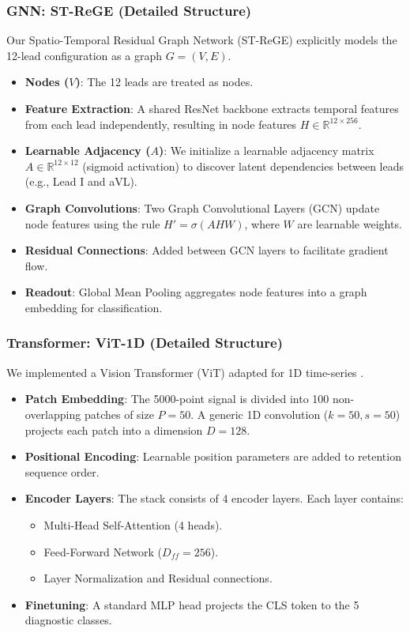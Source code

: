 \documentclass[conference]{IEEEtran}
\begin{document}
\subsubsection{GNN: ST-ReGE (Detailed Structure)}
Our Spatio-Temporal Residual Graph Network (ST-ReGE) explicitly models the 12-lead configuration as a graph $G=(V, E)$.
\begin{itemize}
    \item \textbf{Nodes ($V$)}: The 12 leads are treated as nodes.
    \item \textbf{Feature Extraction}: A shared ResNet backbone extracts temporal features from each lead independently, resulting in node features $H \in \mathbb{R}^{12 \times 256}$.
    \item \textbf{Learnable Adjacency ($A$)}: We initialize a learnable adjacency matrix $A \in \mathbb{R}^{12 \times 12}$ (sigmoid activation) to discover latent dependencies between leads (e.g., Lead I and aVL).
    \item \textbf{Graph Convolutions}: Two Graph Convolutional Layers (GCN) update node features using the rule $H' = \sigma(A H W)$, where $W$ are learnable weights.
    \item \textbf{Residual Connections}: Added between GCN layers to facilitate gradient flow.
    \item \textbf{Readout}: Global Mean Pooling aggregates node features into a graph embedding for classification.
\end{itemize}

\subsubsection{Transformer: ViT-1D (Detailed Structure)}
We implemented a Vision Transformer (ViT) adapted for 1D time-series \cite{vaid2023foundational}.
\begin{itemize}
    \item \textbf{Patch Embedding}: The 5000-point signal is divided into 100 non-overlapping patches of size $P=50$. A generic 1D convolution ($k=50, s=50$) projects each patch into a dimension $D=128$.
    \item \textbf{Positional Encoding}: Learnable position parameters are added to retention sequence order.
    \item \textbf{Encoder Layers}: The stack consists of 4 encoder layers. Each layer contains:
    \begin{itemize}
        \item Multi-Head Self-Attention (4 heads).
        \item Feed-Forward Network ($D_{ff}=256$).
        \item Layer Normalization and Residual connections.
    \end{itemize}
    \item \textbf{Finetuning}: A standard MLP head projects the CLS token to the 5 diagnostic classes.
\end{itemize}
\end{document}
